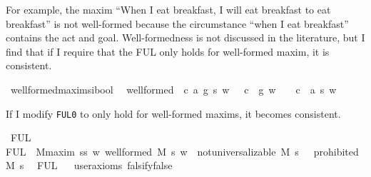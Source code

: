 \begin{isabellebody}
\begin{isamarkuptext}
For example, the maxim ``When I eat breakfast, I will eat breakfast to eat breakfast'' is not well-formed 
because the circumstance ``when I eat breakfast'' contains the act and goal. Well-formedness is not 
discussed in the literature, but I find that if I require that the FUL only holds for well-formed maxim, it is
consistent.%
\end{isamarkuptext}\isamarkuptrue%
\isamarkupfalse%
\ well{\isacharunderscore}formed{\isacharcolon}{\isacharcolon}{\isachardoublequoteopen}maxim{\isasymRightarrow}s{\isasymRightarrow}i{\isasymRightarrow}bool{\isachardoublequoteclose}\ \ \isanewline
{\isachardoublequoteopen}well{\isacharunderscore}formed\ {\isasymequiv}\ {\isasymlambda}{\isacharparenleft}c{\isacharcomma}\ a{\isacharcomma}\ g{\isacharparenright}{\isachardot}\ {\isasymlambda}s{\isachardot}\ {\isasymlambda}w{\isachardot}\ {\isacharparenleft}{\isasymnot}\ \ {\isacharparenleft}c\ \isactrlbold {\isasymrightarrow}\ g{\isacharparenright}\ w{\isacharparenright}\ {\isasymand}\ {\isacharparenleft}{\isasymnot}\ \ {\isacharparenleft}c\ \isactrlbold {\isasymrightarrow}\ a\ s{\isacharparenright}\ w{\isacharparenright}{\isachardoublequoteclose}\isanewline
%
%
\begin{isamarkuptext}%
\noindent If I modify \texttt{FUL0} to only hold for well-formed maxims, it becomes consistent.%
\end{isamarkuptext}\isamarkuptrue%
\isamarkupfalse%
\ FUL\ \ \isanewline
{\isachardoublequoteopen}FUL\ {\isasymequiv}\ {\isasymforall}M{\isacharcolon}{\isacharcolon}maxim{\isachardot}\ {\isasymforall}s{\isacharcolon}{\isacharcolon}s{\isachardot}\ {\isacharparenleft}{\isasymforall}w{\isachardot}\ well{\isacharunderscore}formed\ M\ s\ w{\isacharparenright}\ {\isasymlongrightarrow}\ {\isacharparenleft}not{\isacharunderscore}universalizable\ M\ s\ {\isasymlongrightarrow}\ {\isasymTurnstile}\ {\isacharparenleft}prohibited\ M\ s{\isacharparenright}\ {\isacharparenright}{\isachardoublequoteclose}\isanewline
%
\isanewline
\isanewline
{}\isamarkupfalse%
\ {\isachardoublequoteopen}FUL{\isachardoublequoteclose}\isanewline
\ \ \isamarkupfalse%
{\isacharbrackleft}user{\isacharunderscore}axioms{\isacharcomma}\ falsify{\isacharequal}false{\isacharbrackright}%
\isadelimproof
\ %
\endisadelimproof
%
\isatagproof
{}\isamarkupfalse%
\isanewline
%
\end{isabellebody}
